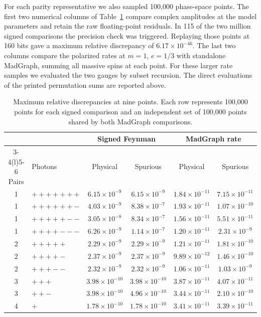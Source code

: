 For each parity representative we also sampled 100,000 phase-space points.
The first two numerical columns of Table~\ref{tab:nine-large-samples}
compare complex amplitudes at the model parameters and retain the raw
floating-point residuals. In 115 of the two million signed comparisons
the precision check was triggered. Replaying those points at 160 bits
gave a maximum relative discrepancy of $6.17\times10^{-46}$. The last two columns compare the
polarized rates at $m=1$, $e=1/3$ with standalone MadGraph, summing all
massive spins at each point. For these larger rate samples we evaluated
the two gauges by subset recursion. The direct evaluations of the
printed permutation sums are reported above.
\begin{table}[htbp]
\centering\small
\begin{tabular}{@{}clcccc@{}}
\toprule
& & \multicolumn{2}{c}{Signed Feynman} & \multicolumn{2}{c}{MadGraph rate}\\
\cmidrule(lr){3-4}\cmidrule(l){5-6}
Pairs & Photons & Physical & Spurious & Physical & Spurious\\
\midrule
1 & $+++++++$ & $6.15\times10^{-9}$ & $6.15\times10^{-9}$ & $1.84\times10^{-11}$ & $7.15\times10^{-11}$ \\
1 & $++++++-$ & $4.03\times10^{-9}$ & $8.38\times10^{-7}$ & $1.93\times10^{-11}$ & $1.07\times10^{-10}$ \\
1 & $+++++--$ & $3.05\times10^{-8}$ & $8.34\times10^{-7}$ & $1.56\times10^{-11}$ & $5.51\times10^{-11}$ \\
1 & $++++---$ & $6.26\times10^{-9}$ & $1.14\times10^{-7}$ & $1.20\times10^{-11}$ & $2.31\times10^{-9}$ \\
2 & $+++++$ & $2.29\times10^{-9}$ & $2.29\times10^{-9}$ & $1.21\times10^{-11}$ & $1.81\times10^{-10}$ \\
2 & $++++-$ & $2.37\times10^{-9}$ & $2.37\times10^{-9}$ & $9.89\times10^{-12}$ & $1.46\times10^{-10}$ \\
2 & $+++--$ & $2.32\times10^{-9}$ & $2.32\times10^{-9}$ & $1.06\times10^{-11}$ & $1.03\times10^{-9}$ \\
3 & $+++$ & $3.98\times10^{-10}$ & $3.98\times10^{-10}$ & $3.87\times10^{-11}$ & $4.07\times10^{-11}$ \\
3 & $++-$ & $3.98\times10^{-10}$ & $4.96\times10^{-10}$ & $3.44\times10^{-11}$ & $2.10\times10^{-10}$ \\
4 & $+$ & $1.78\times10^{-10}$ & $1.78\times10^{-10}$ & $3.41\times10^{-11}$ & $3.39\times10^{-11}$ \\

\bottomrule
\end{tabular}
\caption{Maximum relative discrepancies at nine points. Each row represents
100,000 points for each signed comparison and an independent set of 100,000
points shared by both MadGraph comparisons.}
\label{tab:nine-large-samples}
\end{table}

